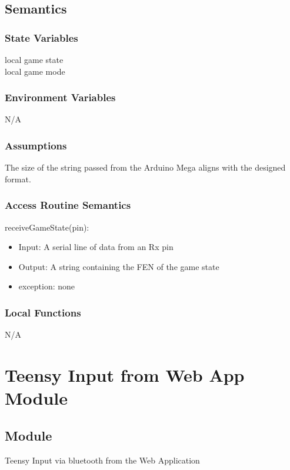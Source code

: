 \documentclass[12pt, titlepage]{article}
\begin{document}
        \subsection{Semantics}
        \subsubsection{State Variables}
        local game state \\
        local game mode
    
        \subsubsection{Environment Variables}
        N/A
    
        \subsubsection{Assumptions}
        The size of the string passed from the Arduino Mega aligns with the designed format. \\
    
        \subsubsection{Access Routine Semantics}
            \noindent receiveGameState(pin):
            \begin{itemize}
                \item Input: A serial line of data from an Rx pin
                \item Output: A string containing the FEN of the game state
                \item exception: none
            \end{itemize}
    
        \subsubsection{Local Functions}
        N/A
    
    \newpage
    
    \section{Teensy Input from Web App Module} \label{TeensyToWaRx}
        \subsection{Module}
        Teensy Input via bluetooth from the Web Application
    
\end{document}
